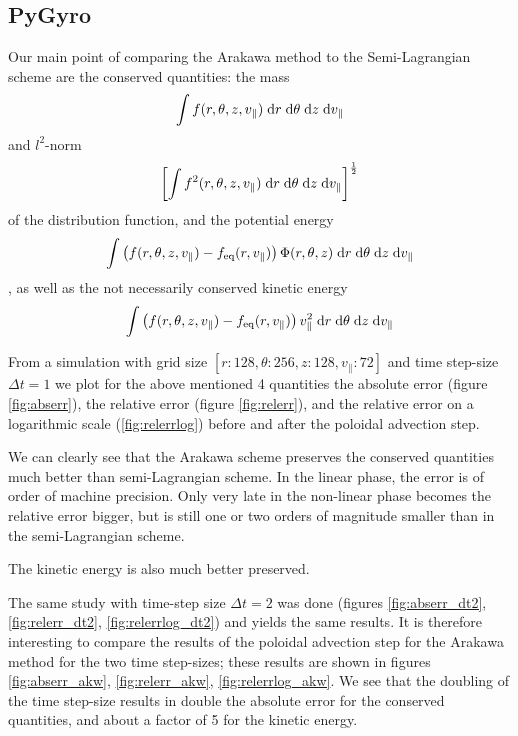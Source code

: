 \subsection{PyGyro}

Our main point of comparing the Arakawa method to the Semi-Lagrangian scheme are the conserved quantities: the mass
\begin{equation}
	\int f(r, \theta, z, v_\parallel) \;\text{d} r \;\text{d} \theta \;\text{d} z \;\text{d} v_\parallel
\end{equation}
and $l^2$-norm
\begin{equation}
	\left[\int f^2(r, \theta, z, v_\parallel) \;\text{d} r \;\text{d} \theta \;\text{d} z \;\text{d} v_\parallel\right]^\frac{1}{2}
\end{equation}
of the distribution function, and the potential energy
\begin{equation}
	\int \left(f(r, \theta, z, v_\parallel) - f_\text{eq}(r, v_\parallel)\right) \Phi(r, \theta, z) \;\text{d} r \;\text{d} \theta \;\text{d} z \;\text{d} v_\parallel
\end{equation}
, as well as the not necessarily conserved kinetic energy
\begin{equation}
	\int \left(f(r, \theta, z, v_\parallel) - f_\text{eq}(r, v_\parallel)\right) v^2_\parallel \;\text{d} r \;\text{d} \theta \;\text{d} z \;\text{d} v_\parallel
\end{equation}

From a simulation with grid size $[r:128, \theta:256, z:128, v_\parallel :72]$ and time step-size $\Delta t = 1$ we plot for the above mentioned 4 quantities the absolute error (figure \ref{fig:abserr}), the relative error (figure \ref{fig:relerr}), and the relative error on a logarithmic scale (\ref{fig:relerrlog}) before and after the poloidal advection step.

We can clearly see that the Arakawa scheme preserves the conserved quantities much better than semi-Lagrangian scheme. In the linear phase, the error is of order of machine precision. Only very late in the non-linear phase becomes the relative error bigger, but is still one or two orders of magnitude smaller than in the semi-Lagrangian scheme.

The kinetic energy is also much better preserved.

The same study with time-step size $\Delta t = 2$ was done (figures \ref{fig:abserr_dt2}, \ref{fig:relerr_dt2}, \ref{fig:relerrlog_dt2}) and yields the same results. It is therefore interesting to compare the results of the poloidal advection step for the Arakawa method for the two time step-sizes; these results are shown in figures \ref{fig:abserr_akw}, \ref{fig:relerr_akw}, \ref{fig:relerrlog_akw}. We see that the doubling of the time step-size results in double the absolute error for the conserved quantities, and about a factor of 5 for the kinetic energy.

